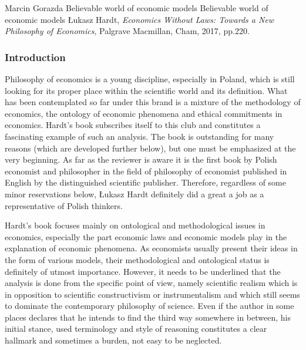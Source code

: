 \begin{recengenv}{Marcin Gorazda}
	{Believable world of economic models}
	{Believable world of economic models}
	{Łukasz Hardt, \textit{Economics Without Laws: Towards a New Philosophy of Economics}, Palgrave Macmillan, Cham, 2017,
		pp.220.}
	
	



\subsubsection{Introduction}
Philosophy of economics is a young discipline, especially in Poland, which is still looking for its proper place within
the scientific world and its definition. What has been contemplated so far under this brand is a mixture of the
methodology of economics, the ontology of economic phenomena and ethical commitments in economics. Hardt’s book
subscribes itself to this club and constitutes a fascinating example of such an analysis. The book is outstanding for
many reasons (which are developed further below), but one must be emphasized at the very beginning. As far as the
reviewer is aware it is the first book by Polish economist and philosopher in the field of philosophy of economist
published in English by the distinguished scientific publisher. Therefore, regardless of some minor reservations below,
Łukasz Hardt definitely did a great a job as a representative of Polish thinkers. 

Hardt’s book focuses mainly on ontological and methodological issues in economics, especially the part economic laws and
economic models play in the explanation of economic phenomena. As economists usually present their ideas in the form of
various models, their methodological and ontological status is definitely of utmost importance. However, it needs to be
underlined that the analysis is done from the specific point of view, namely scientific realism which is in opposition
to scientific constructivism or instrumentalism and which still seems to dominate the contemporary philosophy of
science.  Even if the author in some places declares that he intends to find the third way somewhere in between, his
initial stance, used terminology and style of reasoning constitutes a clear hallmark and sometimes a burden, not easy
to be neglected. 


\end{recengenv}
